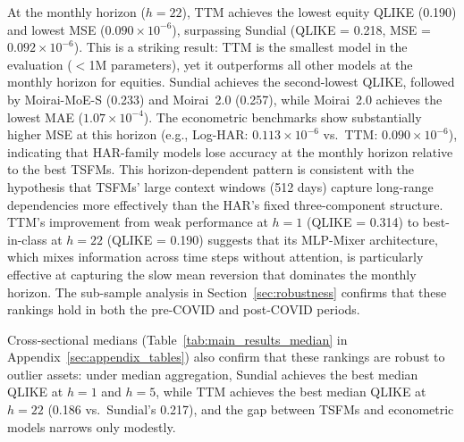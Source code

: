 \documentclass[12pt]{article}
\begin{document}
At the monthly horizon ($h = 22$), TTM achieves the lowest equity QLIKE (0.190) and lowest MSE ($0.090 \times 10^{-6}$), surpassing Sundial (QLIKE = 0.218, MSE = $0.092 \times 10^{-6}$). This is a striking result: TTM is the smallest model in the evaluation ($<$1M parameters), yet it outperforms all other models at the monthly horizon for equities. Sundial achieves the second-lowest QLIKE, followed by Moirai-MoE-S (0.233) and Moirai~2.0 (0.257), while Moirai~2.0 achieves the lowest MAE ($1.07 \times 10^{-4}$). The econometric benchmarks show substantially higher MSE at this horizon (e.g., Log-HAR: $0.113 \times 10^{-6}$ vs.\ TTM: $0.090 \times 10^{-6}$), indicating that HAR-family models lose accuracy at the monthly horizon relative to the best TSFMs. This horizon-dependent pattern is consistent with the hypothesis that TSFMs' large context windows (512 days) capture long-range dependencies more effectively than the HAR's fixed three-component structure. TTM's improvement from weak performance at $h = 1$ (QLIKE = 0.314) to best-in-class at $h = 22$ (QLIKE = 0.190) suggests that its MLP-Mixer architecture, which mixes information across time steps without attention, is particularly effective at capturing the slow mean reversion that dominates the monthly horizon. The sub-sample analysis in Section~\ref{sec:robustness} confirms that these rankings hold in both the pre-COVID and post-COVID periods.

Cross-sectional medians (Table~\ref{tab:main_results_median} in Appendix~\ref{sec:appendix_tables}) also confirm that these rankings are robust to outlier assets: under median aggregation, Sundial achieves the best median QLIKE at $h = 1$ and $h = 5$, while TTM achieves the best median QLIKE at $h = 22$ (0.186 vs.\ Sundial's 0.217), and the gap between TSFMs and econometric models narrows only modestly.
\end{document}
